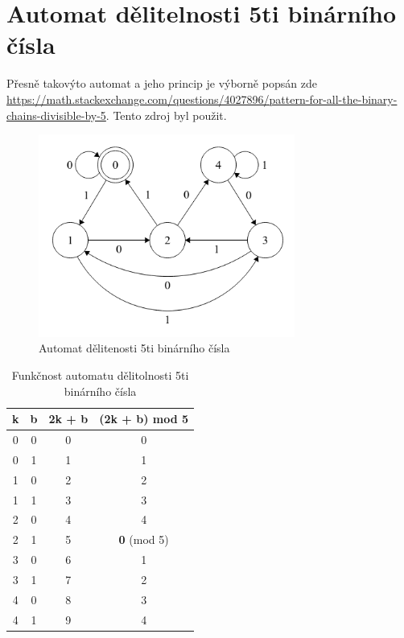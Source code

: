 \documentclass[12pt, letterpaper]{article}
\begin{document}
\section{Automat dělitelnosti 5ti binárního čísla}
Přesně takovýto automat a jeho princip je výborně popsán zde \url{https://math.stackexchange.com/questions/4027896/pattern-for-all-the-binary-chains-divisible-by-5}. Tento zdroj byl použit.
%
\begin{figure}[H]
\begin{center}
\includegraphics[width=0.75\textwidth]{division5.png}
\caption{Automat dělitenosti 5ti binárního čísla}
\label{automata_division_5}
\end{center}
\end{figure}
%
\begin{table}[H]
\begin{center}
\begin{tabular}{| c | c || c | c |}
\hline
	\textbf{k}	& \textbf{b}	& \textbf{2k + b}	& \textbf{(2k + b) mod 5}
\\\hline
	0		& 0 		& 0 			& 0
\\\hline
	0		& 1 		& 1 			& 1
\\\hline
	1		& 0 		& 2 			& 2
\\\hline
	1		& 1 		& 3 			& 3
\\\hline
	2		& 0 		& 4 			& 4
\\\hline
	2		& 1 		& 5 			& \textbf{0} (mod 5)
\\\hline
	3		& 0 		& 6 			& 1
\\\hline
	3		& 1 		& 7 			& 2
\\\hline
	4		& 0 		& 8 			& 3
\\\hline
	4		& 1 		& 9 			& 4

\\\hline
\end{tabular}
\end{center}
\caption{Funkčnost automatu dělitolnosti 5ti binárního čísla}
\label{table_division_5}
\end{table}
%
\end{document}
